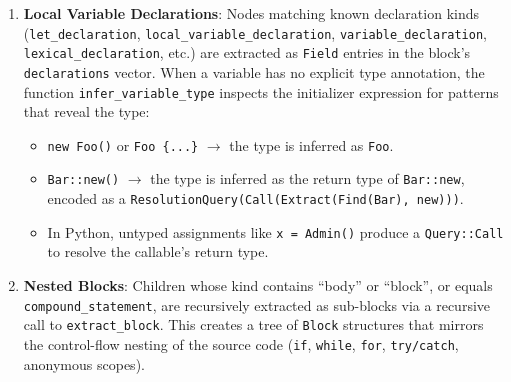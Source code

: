 \begin{enumerate}
  \item \textbf{Local Variable Declarations}: Nodes matching known
    declaration kinds (\texttt{let\_declaration},
      \texttt{local\_variable\_declaration},
      \texttt{variable\_declaration}, \texttt{lexical\_declaration},
    etc.) are extracted as \texttt{Field} entries in the block's
    \texttt{declarations} vector. When a variable has no explicit
    type annotation, the function \texttt{infer\_variable\_type}
    inspects the initializer expression for patterns that reveal the type:
    \begin{itemize}
      \item \texttt{new Foo()} or \texttt{Foo \{...\}} $\to$ the type
        is inferred as \texttt{Foo}.
      \item \texttt{Bar::new()} $\to$ the type is inferred as the
        return type of \texttt{Bar::new}, encoded as a
        \texttt{ResolutionQuery(Call(Extract(Find(Bar), new)))}.
      \item In Python, untyped assignments like \texttt{x = Admin()}
        produce a \texttt{Query::Call} to resolve the callable's return type.
    \end{itemize}

  \item \textbf{Nested Blocks}: Children whose kind contains ``body''
    or ``block'', or equals \texttt{compound\_statement}, are
    recursively extracted as sub-blocks via a recursive call to
    \texttt{extract\_block}. This creates a tree of \texttt{Block}
    structures that mirrors the control-flow nesting of the source
    code (\texttt{if}, \texttt{while}, \texttt{for},
    \texttt{try/catch}, anonymous scopes).


\end{enumerate}
